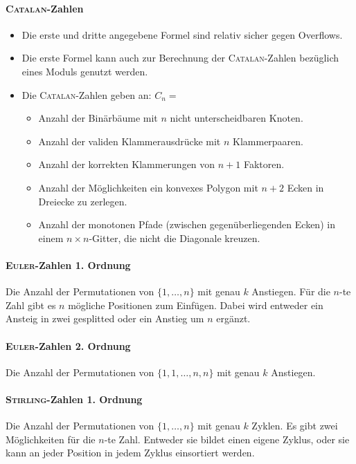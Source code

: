 \paragraph{\textsc{Catalan}-Zahlen}
\begin{itemize}[nosep]
	\item Die erste und dritte angegebene Formel sind relativ sicher gegen Overflows.
	\item Die erste Formel kann auch zur Berechnung der \textsc{Catalan}-Zahlen
	bezüglich eines Moduls genutzt werden.
	\item Die \textsc{Catalan}-Zahlen geben an: $C_n =$
	\begin{itemize}[nosep]
		\item Anzahl der Binärbäume mit $n$ nicht unterscheidbaren Knoten.
		\item Anzahl der validen Klammerausdrücke mit $n$ Klammerpaaren.
		\item Anzahl der korrekten Klammerungen von $n+1$ Faktoren.
		\item Anzahl der Möglichkeiten ein konvexes Polygon mit $n + 2$ Ecken in
		Dreiecke zu zerlegen.
		\item Anzahl der monotonen Pfade (zwischen gegenüberliegenden Ecken) in
		einem $n \times n$-Gitter, die nicht die Diagonale kreuzen.
	\end{itemize}
\end{itemize}

\paragraph{\textsc{Euler}-Zahlen 1. Ordnung}
Die Anzahl der Permutationen von $\{1, \ldots, n\}$ mit genau $k$ Anstiegen.
Für die $n$-te Zahl gibt es $n$ mögliche Positionen zum Einfügen.
Dabei wird entweder ein Ansteig in zwei gesplitted oder ein Anstieg um $n$ ergänzt.

\paragraph{\textsc{Euler}-Zahlen 2. Ordnung}
Die Anzahl der Permutationen von $\{1,1, \ldots, n,n\}$ mit genau $k$ Anstiegen.

\paragraph{\textsc{Stirling}-Zahlen 1. Ordnung}
Die Anzahl der Permutationen von $\{1, \ldots, n\}$ mit genau $k$ Zyklen.
Es gibt zwei Möglichkeiten für die $n$-te Zahl. Entweder sie bildet einen eigene Zyklus, oder sie kann an jeder Position in jedem Zyklus einsortiert werden.

